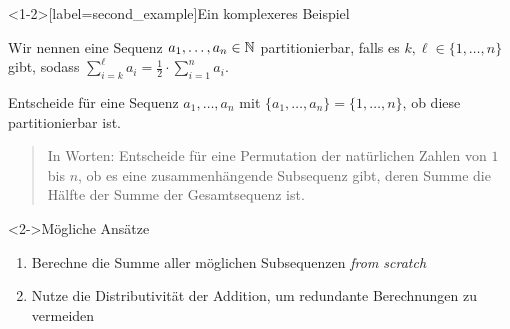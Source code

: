 \begin{frame}<1-2>[label=second_example]{Ein komplexeres Beispiel}
\begin{example}
Wir nennen eine Sequenz $a_1, \dots, a_n \in \mathbb{N}$ \alert{partitionierbar}, falls  es $k, \ell \in \{1, \dots, n\}$ gibt, sodass $\sum_{i=k}^{\ell} a_i = \frac{1}{2} \cdot  \sum_{i=1}^{n} a_i$.

Entscheide f\"ur eine Sequenz $a_1, \dots, a_n$ mit $\{ a_1, \dots, a_n \} = \{1, \dots, n\}$, ob diese partitionierbar ist.

\begin{quote}
    In Worten: Entscheide f\"ur eine \alert{Permutation} der nat\"urlichen Zahlen von $1$ bis $n$, ob es eine \alert{zusammenh\"angende Subsequenz} gibt, deren Summe die \alert{H\"alfte} der Summe der Gesamtsequenz ist.
\end{quote}

\begin{block}<2->{M\"ogliche Ans\"atze}
    \begin{enumerate}
        \item Berechne die Summe aller möglichen Subsequenzen \emph{from scratch}
        \pause
        \item<4-> Nutze die Distributivit\"at der Addition, um redundante Berechnungen zu vermeiden
    \end{enumerate}
\end{block}
\end{example}
\end{frame}

